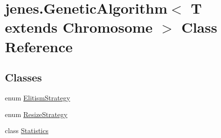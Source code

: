 \hypertarget{classjenes_1_1_genetic_algorithm_3_01_t_01extends_01_chromosome_01_4}{\section{jenes.\-Genetic\-Algorithm$<$ T extends Chromosome $>$ Class Reference}
\label{classjenes_1_1_genetic_algorithm_3_01_t_01extends_01_chromosome_01_4}
}
\subsection*{Classes}
\begin{DoxyCompactItemize}
\item 
enum \hyperlink{enumjenes_1_1_genetic_algorithm_3_01_t_01extends_01_chromosome_01_4_1_1_elitism_strategy}{Elitism\-Strategy}
\item 
enum \hyperlink{enumjenes_1_1_genetic_algorithm_3_01_t_01extends_01_chromosome_01_4_1_1_resize_strategy}{Resize\-Strategy}
\item 
class \hyperlink{classjenes_1_1_genetic_algorithm_3_01_t_01extends_01_chromosome_01_4_1_1_statistics}{Statistics}
\end{DoxyCompactItemize}
